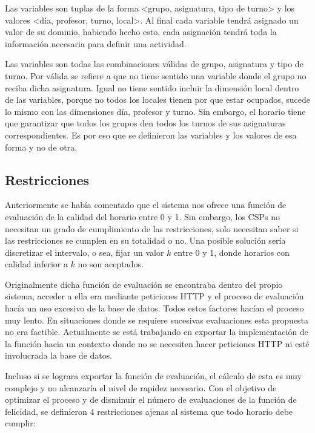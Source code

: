 Las variables son tuplas de la forma <grupo, asignatura, tipo de turno> y los valores <día, profesor, turno, local>. Al final cada variable tendr\'a asignado un valor de su dominio, habiendo hecho esto, cada asignaci\'on tendr\'a toda la informaci\'on necesaria para definir una actividad.

Las variables son todas las combinaciones v\'alidas de grupo, asignatura y tipo de turno. Por v\'alida se refiere a que no tiene sentido una variable donde el grupo no reciba dicha asignatura. Igual no tiene sentido incluir la dimensi\'on local dentro de las variables, porque no todos los locales tienen por que estar ocupados, sucede lo mismo con las dimensiones d\'ia, profesor y turno. Sin embargo, el horario tiene que garantizar que todos los grupos den todos los turnos de sus asignaturas correspondientes. Es por eso que se definieron las variables y los valores de esa forma y no de otra. 

\subsection{Restricciones}

Anteriormente se hab\'ia comentado que el sistema nos ofrece una funci\'on de evaluaci\'on de la calidad del horario entre 0 y 1. Sin embargo, los CSPs no necesitan un grado de cumplimiento de las restricciones, solo necesitan saber si las restricciones se cumplen en su totalidad o no. Una posible soluci\'on ser\'ia discretizar el intervalo, o sea, fijar un valor $k$ entre 0 y 1, donde horarios con calidad inferior a $k$ no son aceptados.

Originalmente dicha funci\'on de evaluaci\'on se encontraba dentro del propio sistema, acceder a ella era mediante peticiones HTTP y el proceso de evaluaci\'on hac\'ia un uso excesivo de la base de datos. Todos estos factores hac\'ian el proceso muy lento. En situaciones donde se requiere sucesivas evaluaciones esta propuesta no era factible. Actualmente se est\'a trabajando en exportar la implementaci\'on de la funci\'on hacia un contexto donde no se necesiten hacer peticiones HTTP ni est\'e involucrada la base de datos.

Incluso si se lograra exportar la funci\'on de evaluaci\'on, el c\'alculo de esta es muy complejo y no alcanzar\'ia el nivel de rapidez necesario. Con el objetivo de optimizar el proceso y de disminuir el n\'umero de evaluaciones de la funci\'on de felicidad, se definieron 4 restricciones ajenas al sistema que todo horario debe cumplir:

